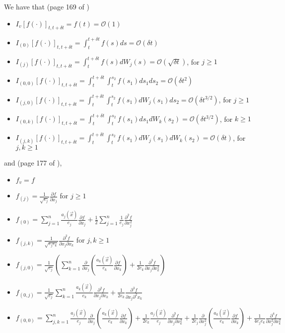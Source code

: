 \documentclass[12pt]{article}
\begin{document}
We have that (page 169 of \cite{kloeden1992numerical})
\begin{itemize}
\item $I_v [f(\cdot)]_{t, t + \delta t} = f(t) = \mathcal{O}(1)$
\item $I_{(0)} [f(\cdot)]_{t, t + \delta t} = \int_{t}^{t + \delta t} f(s) ds = \mathcal{O}(\delta t)$
\item $I_{(j)} [f(\cdot)]_{t, t + \delta t} = \int_{t}^{t + \delta t} f(s) dW_j(s) = \mathcal{O}(\sqrt{\delta t})$, for $j \ge 1$
\item $I_{(0,0)} [f(\cdot)]_{t, t + \delta t} = \int_{t}^{t + \delta t} \int_{t}^{s_2} f(s_1) ds_1 ds_2 = \mathcal{O}(\delta t^2)$
\item $I_{(j,0)} [f(\cdot)]_{t, t + \delta t} = \int_{t}^{t + \delta t} \int_{t}^{s_2} f(s_1) dW_j(s_1) ds_2 = \mathcal{O}(\delta t^{3/2})$, for $j \ge 1$
\item $I_{(0,k)} [f(\cdot)]_{t, t + \delta t} = \int_{t}^{t + \delta t} \int_{t}^{s_2} f(s_1) ds_1 dW_k(s_2) = \mathcal{O}(\delta t^{3/2})$, for $k \ge 1$
\item $I_{(j,k)} [f(\cdot)]_{t, t + \delta t} = \int_{t}^{t + \delta t} \int_{t}^{s_2} f(s_1) dW_j(s_1) dW_k(s_2) = \mathcal{O}(\delta t)$, for $j, k \ge 1$
\end{itemize}
%
and (page 177 of \cite{kloeden1992numerical}),
%
\begin{itemize}
\item $f_v = f$
\item $f_{(j)} = \frac{1}{\sqrt{e_j}} \frac{\partial f}{\partial x_j}$ for $j \ge 1$
\item $f_{(0)} = \sum_{j=1}^n \frac{a_j(\vec{x})}{e_j} \frac{\partial f}{\partial x_j} + \frac{1}{2}\sum_{j=1}^n \frac{1}{e_j} \frac{\partial^2 f}{\partial x_j^2}$
\item $f_{(j, k)} = \frac{1}{\sqrt{e_j e_k}} \frac{\partial^2 f}{\partial x_j \partial x_k}$ for $j,k \ge 1$
\item $f_{(j,0)} = \frac{1}{\sqrt{e_j}} \left( \sum_{k=1}^n \frac{\partial}{\partial x_j} \left( \frac{a_k(\vec{x})}{e_k} \frac{\partial f}{\partial x_k} \right) + \frac{1}{2 e_k} \frac{\partial^3 f}{\partial x_j \partial x_k^2} \right)$
\item $f_{(0, j)} = \frac{1}{\sqrt{e_j}} \sum_{k=1}^n \frac{a_k(\vec{x})}{e_k} \frac{\partial^2 f}{\partial x_j \partial x_k} +\frac{1}{2 e_k}  \frac{\partial^3 f}{\partial x_j \partial^2 x_k}$
\item $f_{(0,0)} = \sum_{j,k=1}^n \frac{a_j(\vec{x})}{e_j} \frac{\partial}{\partial x_j} \left( \frac{a_k(\vec{x})}{e_k} \frac{\partial f}{\partial x_k} \right) + \frac{1}{2 e_k}\frac{a_j(\vec{x})}{e_j} \frac{\partial^3 f}{\partial x_j \partial x_k^2} + \frac{1}{2 e_j} \frac{\partial}{\partial x_j^2} \left( \frac{a_k(\vec{x})}{e_k} \frac{\partial f}{\partial x_k} \right) + \frac{1}{4 e_j e_k} \frac{\partial^4 f}{\partial x_j^2 \partial x_k^2}$
\end{itemize}
\end{document}
